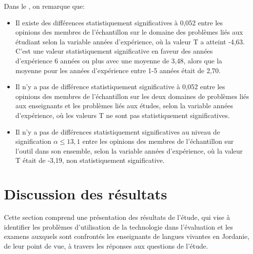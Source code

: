 \documentclass[french]{textolivre}
\begin{document}
Dans le , on remarque que:

\begin{itemize}
    \item Il existe des différences statistiquement significatives à 0,052 entre les opinions des membres de l'échantillon sur le domaine des problèmes liés aux étudiant selon la variable années d'expérience, où la valeur T a atteint -4,63. C'est une valeur statistiquement significative en faveur des années d'expérience 6 années ou plus avec une moyenne de 3,48, alors que la moyenne pour les années d'expérience entre 1-5 années était de 2,70.
    \item Il n'y a pas de différence statistiquement significative à 0,052 entre les opinions des membres de l'échantillon sur les deux domaines de problèmes liés aux enseignants et les  problèmes liés aux études, selon la variable années d'expérience, où les valeurs T ne sont pas statistiquement significatives.
    \item Il n'y a pas de différences statistiquement significatives au niveau de signification $\alpha \leq 13,1$ entre les opinions des membres de l'échantillon sur l'outil dans son ensemble, selon la variable années d'expérience, où la valeur T était de -3,19, non statistiquement significative.
\end{itemize}


\section{Discussion des résultats}
Cette section comprend une présentation des résultats de l'étude, qui vise à identifier les problèmes d'utilisation de la technologie dans l'évaluation et les examens auxquels sont confrontés les enseignants de langues vivantes en Jordanie, de leur point de vue, à travers les réponses aux questions de l'étude.
\end{document}
